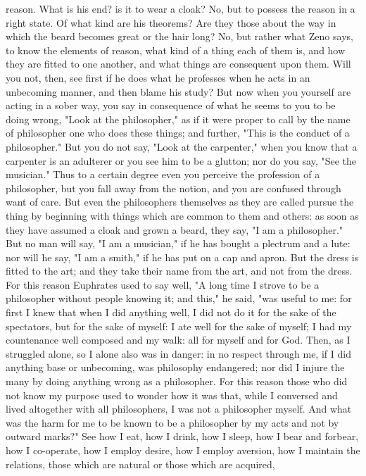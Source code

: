 \documentclass[a4paper]{article}
\begin{document}
reason. What is his end? is it to wear a cloak? No, but to possess the reason
in a right state. Of what kind are his theorems? Are they those about the way
in which the beard becomes great or the hair long? No, but rather what Zeno
says, to know the elements of reason, what kind of a thing each of them is, and
how they are fitted to one another, and what things are consequent upon them.
Will you not, then, see first if he does what he professes when he acts in an
unbecoming manner, and then blame his study? But now when you yourself are
acting in a sober way, you say in consequence of what he seems to you to be
doing wrong, "Look at the philosopher," as if it were proper to call by the
name of philosopher one who does these things; and further, "This is the
conduct of a philosopher." But you do not say, "Look at the carpenter," when
you know that a carpenter is an adulterer or you see him to be a glutton; nor
do you say, "See the musician." Thus to a certain degree even you perceive the
profession of a philosopher, but you fall away from the notion, and you are
confused through want of care.
    But even the philosophers themselves as they are called pursue the thing by
beginning with things which are common to them and others: as soon as they have
assumed a cloak and grown a beard, they say, "I am a philosopher." But no man
will say, "I am a musician," if he has bought a plectrum and a lute: nor will
he say, "I am a smith," if he has put on a cap and apron. But the dress is
fitted to the art; and they take their name from the art, and not from the
dress. For this reason Euphrates used to say well, "A long time I strove to be
a philosopher without people knowing it; and this," he said, "was useful to me:
for first I knew that when I did anything well, I did not do it for the sake of
the spectators, but for the sake of myself: I ate well for the sake of myself;
I had my countenance well composed and my walk: all for myself and for God.
Then, as I struggled alone, so I alone also was in danger: in no respect
through me, if I did anything base or unbecoming, was philosophy endangered;
nor did I injure the many by doing anything wrong as a philosopher. For this
reason those who did not know my purpose used to wonder how it was that, while
I conversed and lived altogether with all philosophers, I was not a philosopher
myself. And what was the harm for me to be known to be a philosopher by my acts
and not by outward marks?" See how I eat, how I drink, how I sleep, how I bear
and forbear, how I co-operate, how I employ desire, how I employ aversion, how
I maintain the relations, those which are natural or those which are acquired,
\end{document}
